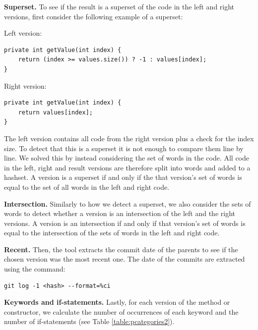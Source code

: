\textbf{Superset.} To see if the result is a superset of the code in the left and right versions, first consider the following example of a superset:

Left version:
\lstset{language=Java,numbers=left,xleftmargin=2em,frame=single,framexleftmargin=1.5em}
\begin{lstlisting}[frame=single,breaklines=true,tabsize=2]
private int getValue(int index) {
	return (index >= values.size()) ? -1 : values[index];
}
\end{lstlisting}

Right version:
\lstset{language=Java,numbers=left,xleftmargin=2em,frame=single,framexleftmargin=1.5em}
\begin{lstlisting}[frame=single,breaklines=true,tabsize=2]
private int getValue(int index) {
	return values[index];
}
\end{lstlisting}
The left version contains all code from the right version plus a check for the index size. To detect that this is a superset it is not enough to compare them line by line. We solved this by instead considering the set of words in the code. All code in the left, right and result versions are therefore split into words and added to a hashset. A version is a superset if and only if the  that version’s set of words is equal to the set of all words in the left and right code.

\textbf{Intersection.} Similarly to how we detect a superset, we also consider the sets of words to detect whether a version is an intersection of the left and the right versions. A version is an intersection if and only if that version’s set of words is equal to the intersection of the sets of words in the left and right code.

\textbf{Recent.} Then, the tool extracts the commit date of the parents to see if the chosen version was the most recent one. The date of the commits are extracted using the command:
\lstset{language=Bash,numbers=left,xleftmargin=2em,frame=single,framexleftmargin=1.5em}
\begin{lstlisting}[frame=single,breaklines=true,tabsize=2]
git log -1 <hash> --format=%ci
\end{lstlisting}

\textbf{Keywords and if-statements.} Lastly, for each version of the method or constructor, we calculate the number of occurrences of each keyword and the number of if-statements (see Table \ref{table:pcategories2}).